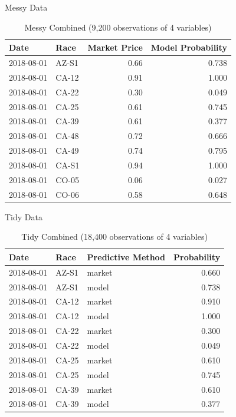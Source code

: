\documentclass[
  ignorenonframetext,
]{beamer}
\begin{document}
\begin{frame}{Messy Data}
\protect\hypertarget{messy-data}{}

\begin{table}

\caption{\label{tab:unnamed-chunk-1}Messy Combined (9,200 observations of 4 variables)}
\centering
\begin{tabular}[t]{l|l|r|r}
\hline
Date & Race & Market Price & Model Probability\\
\hline
2018-08-01 & AZ-S1 & 0.66 & 0.738\\
\hline
2018-08-01 & CA-12 & 0.91 & 1.000\\
\hline
2018-08-01 & CA-22 & 0.30 & 0.049\\
\hline
2018-08-01 & CA-25 & 0.61 & 0.745\\
\hline
2018-08-01 & CA-39 & 0.61 & 0.377\\
\hline
2018-08-01 & CA-48 & 0.72 & 0.666\\
\hline
2018-08-01 & CA-49 & 0.74 & 0.795\\
\hline
2018-08-01 & CA-S1 & 0.94 & 1.000\\
\hline
2018-08-01 & CO-05 & 0.06 & 0.027\\
\hline
2018-08-01 & CO-06 & 0.58 & 0.648\\
\hline
\end{tabular}
\end{table}

\end{frame}

\begin{frame}{Tidy Data}
\protect\hypertarget{tidy-data}{}

\begin{table}

\caption{\label{tab:unnamed-chunk-2}Tidy Combined (18,400 observations of 4 variables)}
\centering
\begin{tabular}[t]{l|l|l|r}
\hline
Date & Race & Predictive Method & Probability\\
\hline
2018-08-01 & AZ-S1 & market & 0.660\\
\hline
2018-08-01 & AZ-S1 & model & 0.738\\
\hline
2018-08-01 & CA-12 & market & 0.910\\
\hline
2018-08-01 & CA-12 & model & 1.000\\
\hline
2018-08-01 & CA-22 & market & 0.300\\
\hline
2018-08-01 & CA-22 & model & 0.049\\
\hline
2018-08-01 & CA-25 & market & 0.610\\
\hline
2018-08-01 & CA-25 & model & 0.745\\
\hline
2018-08-01 & CA-39 & market & 0.610\\
\hline
2018-08-01 & CA-39 & model & 0.377\\
\hline
\end{tabular}
\end{table}

\end{frame}
\end{document}
